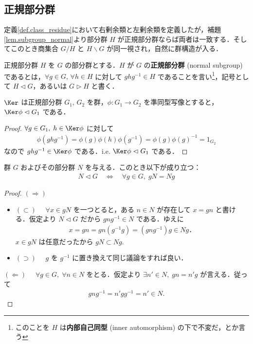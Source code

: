 \documentclass[geometry_main]{subfiles}
\begin{document}
\subsection{正規部分群}

定義\ref{def.class_residue}において右剰余類と左剰余類を定義したが，補題\ref{lem.subgroup_normal}より部分群 $H$ が正規部分群ならば両者は一致する．そしてこのとき商集合 $G/H$ と $H \backslash G$ が同一視され，自然に群構造が入る．

\begin{mydef}[label=def.subgroup_normal]{正規部分群}
	$H$ を $G$ の部分群とする．$H$ が $G$ の\textbf{正規部分群} (normal subgroup) であるとは，$\forall g \in G,\, \forall h \in H$ に対して $ghg^{-1} \in H$ であることを言い\footnote{このことを $H$ は\textbf{内部自己同型} (inner automorphism) の下で不変だ，とか言う}，記号として $H \vartriangleleft G$，あるいは $G \vartriangleright H$ と書く．
\end{mydef}

\begin{myprop}[label=prop.kernel1]{$\Ker$ は正規部分群}
	$G_1,\, G_2$ を群，$\phi \colon G_1 \to G_2$ を準同型写像とすると，$\Ker \phi \vartriangleleft G_1$ である．
\end{myprop}
\begin{proof}
	$\forall g\in G_1,\; h \in \Ker \phi$ に対して
	\begin{align}
		\phi(ghg^{-1}) = \phi(g)\phi(h)\phi(g^{-1}) = \phi(g)\phi(g)^{-1} = 1_{G_2}
	\end{align}
	なので $ghg^{-1} \in \Ker \phi$ である．i.e. $\Ker \phi \vartriangleleft G_1$ である．
\end{proof}

\begin{mylem}[label=lem.subgroup_normal]{}
	群 $G$ およびその部分群 $N$ を与える．このとき以下が成り立つ：
	\begin{align}
		N \vartriangleleft G \quad \Longleftrightarrow \quad \forall g \in G,\; gN = Ng
	\end{align}
\end{mylem}
\begin{proof}
	$(\Longrightarrow)$　
	\begin{itemize}
		\item $(\subset)$ 　$\forall x \in gN$ を一つとると，ある $n \in N$ が存在して $x = gn$ と書ける．仮定より $N \vartriangleleft G$ だから $gng^{-1} \in N$ である．ゆえに
		\begin{align}
			x = gn = gn(g^{-1}g) = (gng^{-1})g \in Ng．
		\end{align}
		$x \in gN$ は任意だったから $gN \subset Ng.$

		\item $(\supset)$ 　$g$ を $g^{-1}$ に置き換えて同じ議論をすれば良い．
	\end{itemize}

	$(\Longleftarrow)$　
	$\forall g \in G,\; \forall n \in N$ をとる．仮定より $\exists n' \in N,\; gn = n'g$ が言える．従って
	\begin{align}
		gng^{-1} = n'gg^{-1} = n' \in N.
	\end{align}
\end{proof}
\end{document}
